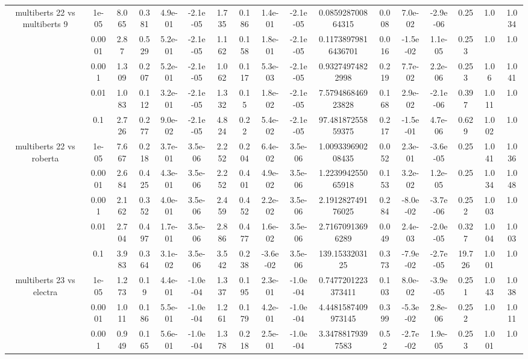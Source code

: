 \begin{tabular}{|c|c|c|c|c|c|c|c|c|c|c|c|c|c|c|c|c|}
\hline
\multirow{5}{*}{multiberts 22 vs multiberts 9} & 1e-05 & 8.065 & 0.381 & 4.9e-01 & -2.1e-05 & 1.735 & 0.186 & 1.4e-01 & -2.1e-05 & 0.085928700864315 & 0.008 & 7.0e-02 & -2.9e-06 & 0.25 & 1.0 & 1.034 \\
 & 0.0001 & 2.87 & 0.529 & 5.2e-01 & -2.1e-05 & 1.162 & 0.158 & 1.8e-01 & -2.1e-05 & 0.11738979816436701 & 0.016 & -1.5e-02 & 1.1e-05 & 0.253 & 1.0 & 1.0 \\
 & 0.001 & 1.309 & 0.207 & 5.2e-01 & -2.1e-05 & 1.062 & 0.117 & 5.3e-03 & -2.1e-05 & 0.93274974822998 & 0.219 & 7.7e-02 & 2.2e-06 & 0.253 & 1.06 & 1.041 \\
 & 0.01 & 1.083 & 0.112 & 3.2e-01 & -2.1e-05 & 1.332 & 0.15 & 1.8e-02 & -2.1e-05 & 7.579486846923828 & 0.168 & 2.9e-02 & -2.1e-06 & 0.397 & 1.011 & 1.0 \\
 & 0.1 & 2.726 & 0.277 & 9.0e-02 & -2.1e-05 & 4.824 & 0.22 & 5.4e-02 & -2.1e-05 & 97.48187255859375 & 0.217 & -1.5e-01 & 4.7e-06 & 0.629 & 1.002 & 1.0 \\
\hline
\multirow{5}{*}{multiberts 22 vs roberta } & 1e-05 & 7.667 & 0.218 & 3.7e-01 & 3.5e-06 & 2.252 & 0.204 & 6.4e-02 & 3.5e-06 & 1.009339690208435 & 0.052 & 2.3e-01 & -3.6e-05 & 0.25 & 1.041 & 1.036 \\
 & 0.0001 & 2.684 & 0.425 & 4.3e-01 & 3.5e-06 & 2.252 & 0.401 & 4.9e-02 & 3.5e-06 & 1.223994255065918 & 0.153 & 3.2e-02 & 1.2e-05 & 0.25 & 1.034 & 1.048 \\
 & 0.001 & 2.162 & 0.352 & 4.0e-01 & 3.5e-06 & 2.459 & 0.452 & 2.2e-02 & 3.5e-06 & 2.191282749176025 & 0.284 & -8.0e-02 & -3.7e-06 & 0.252 & 1.003 & 1.0 \\
 & 0.01 & 2.704 & 0.497 & 1.7e-01 & 3.5e-06 & 2.886 & 0.477 & 1.6e-02 & 3.5e-06 & 2.71670913696289 & 0.049 & 2.4e-03 & -2.0e-05 & 0.327 & 1.004 & 1.003 \\
 & 0.1 & 3.983 & 0.364 & 3.1e-02 & 3.5e-06 & 3.542 & 0.238 & -3.6e-02 & 3.5e-06 & 139.1533203125 & 0.373 & -7.9e-02 & -2.7e-05 & 19.726 & 1.001 & 1.0 \\
\hline
\multirow{5}{*}{multiberts 23 vs electra } & 1e-05 & 1.273 & 0.19 & 4.4e-01 & -1.0e-04 & 1.337 & 0.195 & 2.3e-01 & -1.0e-04 & 0.7477201223373411 & 0.103 & 8.0e-02 & -3.9e-05 & 0.251 & 1.043 & 1.038 \\
 & 0.0001 & 1.011 & 0.186 & 5.5e-01 & -1.0e-04 & 1.261 & 0.179 & 4.2e-01 & -1.0e-04 & 4.4481587409973145 & 0.399 & -5.3e-02 & 2.8e-06 & 0.252 & 1.0 & 1.011 \\
 & 0.001 & 0.949 & 0.165 & 5.6e-01 & -1.0e-04 & 1.378 & 0.218 & 2.5e-01 & -1.0e-04 & 3.34788179397583 & 0.52 & -2.7e-02 & 1.9e-05 & 0.253 & 1.001 & 1.0 \\

\end{tabular}
